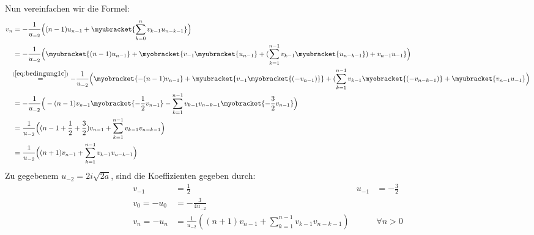 \begin{comment}
und analog, für $n=1$ und $n=2$
\begin{align*}
v_1&= -\frac{3}{2u_{-2}^2} = \frac{3}{16a} = -u_1 &\mbox{und}
  & & v_2&= -\frac{63}{16u_{-2}^3} = -\frac{63i}{256a\sqrt{2a}} = -u_2 \,.
\end{align*}
Die letzten zwei Paare sind für die Berechnung nicht von Bedeutung und dienen
nur dazu, das Programm zu prüfen.
\end{comment}
Nun vereinfachen wir die Formel:
\begin{align*}
v_{n} &= -\frac{1}{u_{-2}}
  \Big((n-1)u_{n-1} + \myubracket{\sum_{k=0}^{n} v_{k-1}u_{n-k-1}}\Big)
\\&= -\frac{1}{u_{-2}}
  \Big(\myubracket{(n-1)u_{n-1}} + \myobracket{v_{-1}\myubracket{u_{n-1}}
  + (\sum_{k=1}^{n-1} v_{k-1}\myubracket{u_{n-k-1}}) + v_{n-1}u_{-1}}\Big)
\\&\!\!\overset{(\ref{eq:bedingung1c})}{=} -\frac{1}{u_{-2}}
  \Big(\myobracket{-(n-1)v_{n-1}} + \myubracket{v_{-1}\myobracket{(-v_{n-1})}}
  + (\sum_{k=1}^{n-1} v_{k-1}\myobracket{(-v_{n-k-1})}
  + \myubracket{v_{n-1}u_{-1}}\Big)
\\&= -\frac{1}{u_{-2}} \Big(-(n-1)v_{n-1} \myobracket{-\frac{1}{2}v_{n-1}}
  - \sum_{k=1}^{n-1} v_{k-1}v_{n-k-1} \myobracket{- \frac{3}{2} v_{n-1}}\Big)
\\&= \frac{1}{u_{-2}} \Big((n-1+\frac{1}{2}+\frac{3}{2})v_{n-1}
  + \sum_{k=1}^{n-1} v_{k-1}v_{n-k-1}\Big)
\\&=\frac{1}{u_{-2}} \Big((n+1)v_{n-1} + \sum_{k=1}^{n-1} v_{k-1}v_{n-k-1}\Big)
\end{align*}
Zu gegebenem $u_{-2}=2i\sqrt{2a}$, sind die Koeffizienten gegeben durch:
\begin{align*}
v_{-1}&=\frac{1}{2} & u_{-1}&=-\frac{3}{2}
\\v_{0} = -u_{0} &= -\frac{3}{4u_{-2}}
\\v_n = - u_n &= \frac{1}{u_{-2}}
  \left((n+1)v_{n-1} + \sum_{k=1}^{n-1} v_{k-1}v_{n-k-1}\right)
  & & \forall n > 0
\end{align*}
